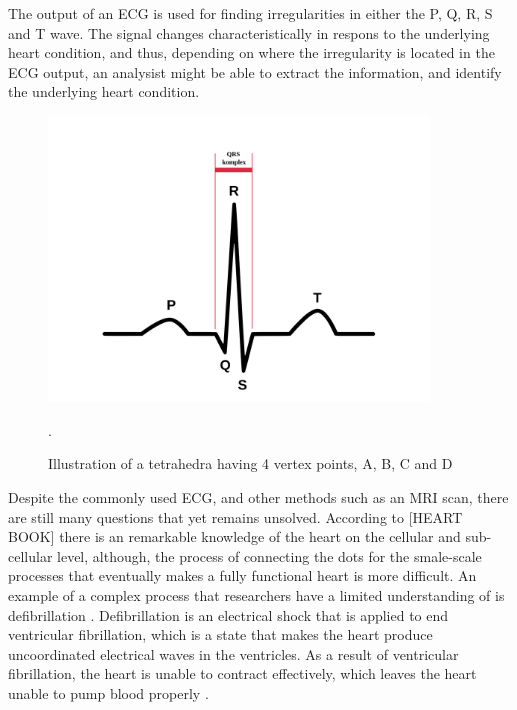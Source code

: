The output of an ECG is used for finding irregularities in either the P, Q, R, S and T wave. The signal changes characteristically in respons to the underlying heart condition, and thus, depending on where the irregularity is located in the ECG output, an analysist might be able to extract the information, and identify the underlying heart condition.
\begin{figure}[h]
 \centering 
     \includegraphics[width=0.9\textwidth]{bilder/b_ecg_pqrst}
     \caption{Illustration of a tetrahedra having 4 vertex points, A, B, C and D}.
     \label{b_ecg_pqrst.png}
\end{figure}

Despite the commonly used ECG, and other methods such as an MRI scan, there are still many questions that yet remains unsolved. According to [HEART BOOK] there is an remarkable knowledge of the heart on the cellular and sub-cellular level, although, the process of connecting the dots for the smale-scale processes that eventually makes a fully functional heart is more difficult. An example of a complex process that researchers have a limited understanding of is defibrillation \cite{article24}. Defibrillation is an electrical shock that is applied to end ventricular fibrillation, which is a state that makes the heart produce uncoordinated electrical waves in the ventricles. As a result of ventricular fibrillation, the heart is unable to contract effectively, which leaves the heart unable to pump blood properly \cite{article24}. 











